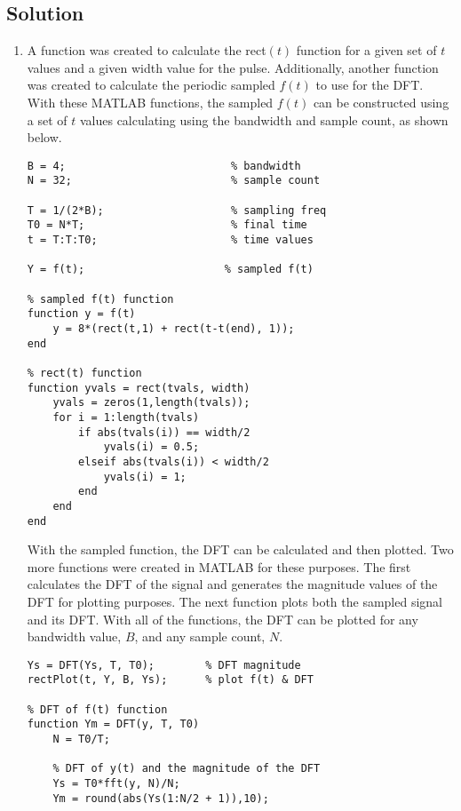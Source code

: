 \documentclass{article}
\begin{document}
\subsection{Solution}
\begin{enumerate}
    \item A function was created to calculate the rect$(t)$ function for a given set of $t$ values and a given width value for the pulse. Additionally, another function was created to calculate the periodic sampled $f(t)$ to use for the DFT. With these MATLAB functions, the sampled $f(t)$ can be constructed using a set of $t$ values calculating using the bandwidth and sample count, as shown below.

    \begin{lstlisting}[style=Matlab-editor]
B = 4;                          % bandwidth
N = 32;                         % sample count

T = 1/(2*B);                    % sampling freq
T0 = N*T;                       % final time 
t = T:T:T0;                     % time values

Y = f(t);                      % sampled f(t)

% sampled f(t) function
function y = f(t)    
    y = 8*(rect(t,1) + rect(t-t(end), 1));
end

% rect(t) function
function yvals = rect(tvals, width)
    yvals = zeros(1,length(tvals));
    for i = 1:length(tvals)
        if abs(tvals(i)) == width/2 
            yvals(i) = 0.5;
        elseif abs(tvals(i)) < width/2 
            yvals(i) = 1;
        end
    end
end
    \end{lstlisting}

    With the sampled function, the DFT can be calculated and then plotted. Two more functions were created in MATLAB for these purposes. The first calculates the DFT of the signal and generates the magnitude values of the DFT for plotting purposes. The next function plots both the sampled signal and its DFT.  With all of the functions, the DFT can be plotted for any bandwidth value, $B$, and any sample count, $N$.

    \begin{lstlisting}[style=Matlab-editor]
Ys = DFT(Ys, T, T0);        % DFT magnitude
rectPlot(t, Y, B, Ys);      % plot f(t) & DFT
    
% DFT of f(t) function
function Ym = DFT(y, T, T0)
    N = T0/T;

    % DFT of y(t) and the magnitude of the DFT
    Ys = T0*fft(y, N)/N;
    Ym = round(abs(Ys(1:N/2 + 1)),10);


\end{lstlisting}
\end{enumerate}
\end{document}
